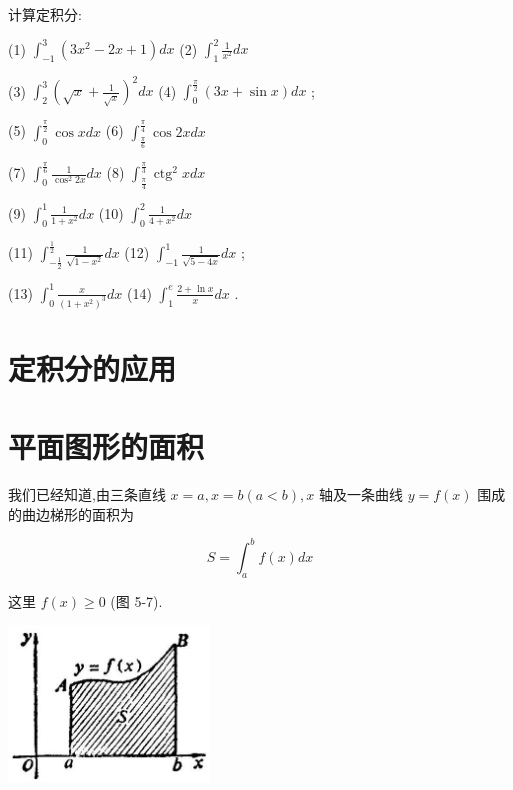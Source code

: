 \documentclass[lang=cn,newtx,12pt,scheme=chinese]{elegantbook}
\begin{document}
\begin{problemset}[习 题 十 五]

\item 计算定积分:

(1) \({\int }_{-1}^{3}\left( {3{x}^{2} - {2x} + 1}\right) {dx}\) (2) \({\int }_{1}^{2}\frac{1}{{x}^{2}}{dx}\)

(3) \({\int }_{2}^{3}{\left( \sqrt{x} + \frac{1}{\sqrt{x}}\right) }^{2}{dx}\) (4) \({\int }_{0}^{\frac{\pi }{2}}\left( {{3x} + \sin x}\right) {dx}\) ;

(5) \({\int }_{0}^{\frac{\pi }{2}}\cos {xdx}\) (6) \({\int }_{\frac{\pi }{6}}^{\frac{\pi }{4}}\cos {2xdx}\)

(7) \({\int }_{0}^{\frac{\pi }{6}}\frac{1}{{\cos }^{2}{2x}}{dx}\) (8) \({\int }_{\frac{\pi }{4}}^{\frac{\pi }{3}}{\operatorname{ctg}}^{2}{xdx}\)

(9) \({\int }_{0}^{1}\frac{1}{1 + {x}^{2}}{dx}\) (10) \({\int }_{0}^{2}\frac{1}{4 + {x}^{2}}{dx}\)

(11) \({\int }_{-\frac{1}{2}}^{\frac{1}{2}}\frac{1}{\sqrt{1 - {x}^{2}}}{dx}\) (12) \({\int }_{-1}^{1}\frac{1}{\sqrt{5 - {4x}}}{dx}\) ;

(13) \({\int }_{0}^{1}\frac{x}{{\left( 1 + {x}^{2}\right) }^{3}}{dx}\) (14) \({\int }_{1}^{e}\frac{2 + \ln x}{x}{dx}\) .

\end{problemset}

\section*{定积分的应用}

\section{平面图形的面积}

我们已经知道,由三条直线 \(x = a,x = b\left( {a < b}\right) ,x\) 轴及一条曲线 \(y = f\left( x\right)\) 围成的曲边梯形的面积为

\[
S = {\int }_{a}^{b}f\left( x\right) {dx}
\]

这里 \(f\left( x\right) \geq 0\) (图 5-7).

\begin{center}
\includegraphics[max width=0.4\textwidth]{images/01912c18-5c3f-733d-b775-749ba9897a9d_232_528761.jpg}
\end{center}
\end{document}

